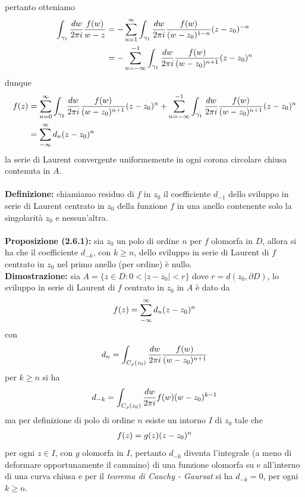 \documentclass{article}
\begin{document}
pertanto otteniamo
\begin{align}
    \int_{\gamma_1}\frac{dw}{2\pi i}\frac{f(w)}{w - z} &= -\sum_{n = 1}^\infty\int_{\gamma_1}\frac{dw}{2\pi i}\frac{f(w)}{(w - z_0)^{1-n}}(z - z_0)^{-n} \notag \\
    &= -\sum_{n = -\infty}^{-1}\int_{\gamma_1}\frac{dw}{2\pi i}\frac{f(w)}{(w - z_0)^{n + 1}}(z - z_0)^{n} \notag
\end{align}
dunque
\begin{align}
    f(z) &= \sum_{n = 0}^\infty\int_{\gamma_2}\frac{dw}{2\pi i}\frac{f(w)}{(w - z_0)^{n + 1}}(z - z_0)^n + \sum_{n = -\infty}^{-1}\int_{\gamma_1}\frac{dw}{2\pi i}\frac{f(w)}{(w - z_0)^{n + 1}}(z - z_0)^{n} \notag \\
    &= \sum_{-\infty}^{\infty}d_n(z - z_0)^n \notag
\end{align}
la serie di Laurent convergente uniformemente in ogni corona circolare chiusa contenuta in $A$. \\ \\
\textbf{Definizione:} chiamiamo residuo di $f$ in $z_0$ il coefficiente $d_{-1}$ dello sviluppo in serie di Laurent centrato in $z_0$ della funzione $f$ in una anello contenente solo la singolarità $z_0$ e nessun'altra. \\ \\
\textbf{Proposizione (2.6.1):} sia $z_0$ un polo di ordine $n$ per $f$ olomorfa in $D$, allora si ha che il coefficiente $d_{-k}$, con $k \geq n$, dello sviluppo in serie di Laurent di $f$ centrato in $z_0$ nel primo anello (per ordine) è nullo. \\

\textbf{Dimostrazione:} sia $A = \{z \in D : 0 < |z - z_0| < r\}$ dove $r = d(z_0, \partial D)$, lo sviluppo in serie di Laurent di $f$ centrato in $z_0$ in $A$ è dato da
\begin{gather}
    f(z) = \sum_{-\infty}^{\infty}d_n(z - z_0)^n \notag
\end{gather}
con
\begin{gather}
    d_n = \int_{C_\rho(z_0)} \frac{dw}{2\pi i}\frac{f(w)}{(w - z_0)^{n + 1}} \notag
\end{gather}
per $k \geq n$ si ha
\begin{align}
    d_{-k} = \int_{C_\rho(z_0)} \frac{dw}{2\pi i}f(w)(w - z_0)^{k - 1} \notag
\end{align}
ma per definizione di polo di ordine $n$ esiste un intorno $I$ di $z_0$ tale che
\begin{gather}
    f(z) = g(z)(z - z_0)^n \notag
\end{gather}
per ogni $z \in I$, con $g$ olomorfa in $I$, pertanto $d_{-k}$ diventa l'integrale (a meno di deformare opportunamente il cammino) di una funzione olomorfa su e all'interno di una curva chiusa e per il \textit{teorema di Cauchy - Gaursat} si ha $d_{-k} = 0$, per ogni $k \geq n$.
\end{document}
